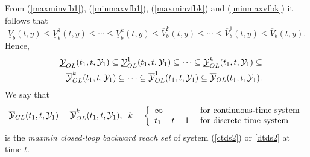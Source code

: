 From (\ref{maxminvfb1}), (\ref{minmaxvfb1}), (\ref{maxminvfbk}) and
(\ref{minmaxvfbk}) it follows that
\[ \underline{V}_b(t, y) \leq \underline{V}^1_b(t, y)\leq \cdots
\leq \underline{V}^k_b(t, y) \leq \overline{V}^k_b(t, y) \leq \cdots
\leq \overline{V}^1_b(t, y) \leq \overline{V}_b(t, y) .\]
Hence,
\begin{eqnarray}
&&\UYOL(t_1, t, \YY_1) \subseteq \UYOL^1(t_1, t, \YY_1) \subseteq \cdots
\subseteq \UYOL^k(t_1, t, \YY_1) \subseteq \nonumber \\
&&\OYOL^k(t_1, t, \YY_1) \subseteq \cdots \subseteq \OYOL^1(t_1, t, \YY_1)
\subseteq \OYOL(t_1, t, \YY_1) .
\label{olbrsinclusion}
\end{eqnarray}
We say that
\begin{equation}
\OYCL(t_1, t, \YY_1) = \OYOL^k(t_1, t, \YY_1), \;\;
k = \left\{\begin{array}{ll}
\infty & \mbox{ for continuous-time system}\\
t_1-t-1 & \mbox{ for discrete-time system}\end{array}\right.
\label{maxminclbrs}
\end{equation}
is the \emph{maxmin closed-loop backward reach set}
of system (\ref{ctds2}) or \ref{dtds2} at time $t$.

